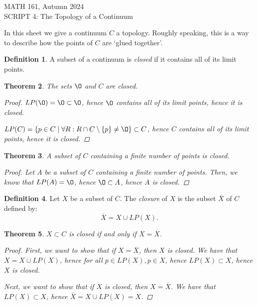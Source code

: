 \documentclass[11pt]{article}
\renewcommand{\emptyset}{\O}
\renewcommand{\_}[1]{\underline{ #1 }}
\newcommand{\head}[1]{
	\begin{center}
		{\large #1}
		\vspace{.2 in}
	\end{center}
	
	\bigskip 
}
\newtheorem{theorem}{Theorem}[section]
\theoremstyle{definition}
\newtheorem{definition}[theorem]{Definition}
\numberwithin{equation}{subsection}
\begin{document}
\head
{ MATH 161, Autumn 2024\\ SCRIPT 4: The Topology of a Continuum} 





\setcounter{section}{4}   


In this sheet we give a continuum $C$ a topology.  Roughly speaking, this is a way to describe how the points of $C$ are `glued together'.  

\medskip




\begin{definition}
A subset of a continuum is \emph{closed} if it contains all of its limit points.
\end{definition}

\begin{theorem}  The sets $\emptyset$ and $C$ are closed.
\begin{proof}
$LP(\emptyset)=\emptyset \subset \emptyset$, hence $\emptyset$ contains all of its limit points, hence it is closed.

$LP(C) = \{p \in C \mid \forall R: R\cap C\setminus\{p\} \not = \emptyset\} \subset C$, hence $C$ contains all of its limit points, hence it is closed.

\renewcommand\qedsymbol{QED}
\end{proof}

\end{theorem}

\begin{theorem}  A subset of $C$ containing a finite number of points is closed.
\begin{proof}
Let $A$ be a subset of $C$ containing a finite number of points. Then, we know that $LP(A) = \emptyset$, hence $\emptyset \subset A$, hence $A$ is closed.

\renewcommand\qedsymbol{QED}
\end{proof}
\end{theorem}

\begin{definition}
Let $X$ be a subset of $C$.  The \emph{closure} of $X$ is the subset $\overline{X}$ of $C$ defined by:
\[
\overline{X} = X \cup LP(X).
\]
\end{definition}

\begin{theorem}  $X \subset C$ is closed if and only if $X = \overline{X}$.
\begin{proof}
First, we want to show that if $X = \overline{X}$, then $X$ is closed. We have that $X = X \cup LP(X)$, hence for all $p \in LP(X), p\in X$, hence $LP(X) \subset X$, hence $X$ is closed.

Next, we want to show that if $X$ is closed, then $X = \overline{X}$. We have that $LP(X) \subset X$, hence $\overline{X} = X \cup LP(X) = X$.

\renewcommand\qedsymbol{QED}
\end{proof}
\end{theorem}
\end{document}
